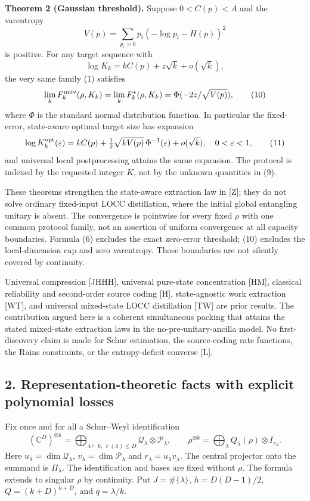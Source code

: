 \documentclass[11pt]{article}
\begin{document}
\textbf{Theorem 2 (Gaussian threshold).} Suppose \(0<C(p)<A\) and the varentropy \[
 V(p)=\sum_{p_i>0}p_i(-\log p_i-H(p))^2
 \tag{8}
\] is positive. For any target sequence with \[
 \log K_k=kC(p)+z\sqrt{k}+o(\sqrt{k}),
 \tag{9}
\] the very same family (1) satisfies \[
 \lim_k F_k^{\rm univ}(\rho,K_k)
 =\lim_k F_k^\star(\rho,K_k)
 =\Phi(-2z/\sqrt{V(p)}),
 \tag{10}
\] where \(\Phi\) is the standard normal distribution function. In particular the fixed-error, state-aware optimal target size has expansion \[
 \log K_k^{\rm opt}(\varepsilon)
 =kC(p)+\tfrac12\sqrt{kV(p)}\,\Phi^{-1}(\varepsilon)+o(\sqrt{k}),
 \quad 0<\varepsilon<1,
 \tag{11}
\] and universal local postprocessing attains the same expansion. The protocol is indexed by the requested integer \(K\), not by the unknown quantities in (9).

These theorems strengthen the state-aware extraction law in {[}Z{]}; they do not solve ordinary fixed-input LOCC distillation, where the initial global entangling unitary is absent. The convergence is pointwise for every fixed \(\rho\) with one common protocol family, not an assertion of uniform convergence at all capacity boundaries. Formula (6) excludes the exact zero-error threshold; (10) excludes the local-dimension cap and zero varentropy. Those boundaries are not silently covered by continuity.

Universal compression {[}JHHH{]}, universal pure-state concentration {[}HM{]}, classical reliability and second-order source coding {[}H{]}, state-agnostic work extraction {[}WT{]}, and universal mixed-state LOCC distillation {[}TW{]} are prior results. The contribution argued here is a coherent simultaneous packing that attains the stated mixed-state extraction laws in the no-pre-unitary-ancilla model. No first-discovery claim is made for Schur estimation, the source-coding rate functions, the Rains constraints, or the entropy-deficit converse {[}L{]}.

\hypertarget{representation-theoretic-facts-with-explicit-polynomial-losses}{%
\subsection{2. Representation-theoretic facts with explicit polynomial losses}\label{representation-theoretic-facts-with-explicit-polynomial-losses}}

Fix once and for all a Schur--Weyl identification \[
 (\mathbb C^D)^{\otimes k}
 =\bigoplus_{\lambda\vdash k,\,\ell(\lambda)\le D}
       \mathcal Q_\lambda\otimes\mathcal P_\lambda,
 \qquad
 \rho^{\otimes k}=\bigoplus_\lambda Q_\lambda(\rho)\otimes I_{v_\lambda}.
 \tag{12}
\] Here \(u_\lambda=\dim\mathcal Q_\lambda\), \(v_\lambda=\dim\mathcal P_\lambda\) and \(r_\lambda=u_\lambda v_\lambda\). The central projector onto the summand is \(\Pi_\lambda\). The identification and bases are fixed without \(\rho\). The formula extends to singular \(\rho\) by continuity. Put \(J=\#\{\lambda\}\), \(h=D(D-1)/2\), \(Q=(k+D)^{h+D}\), and \(q=\lambda/k\).
\end{document}
